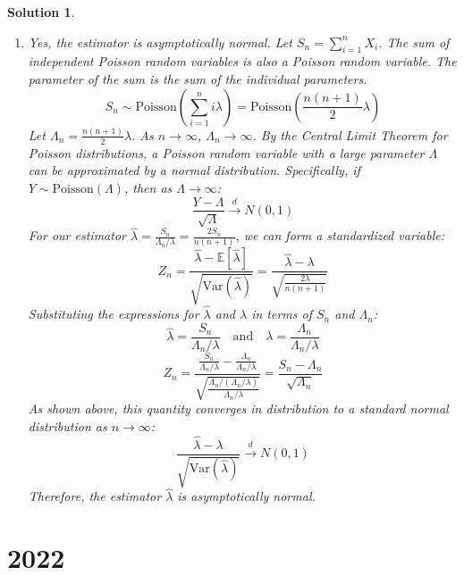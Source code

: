 \documentclass[12pt]{amsart}
\newtheorem*{solution}{Solution}
\begin{document}
\begin{solution}
\begin{enumerate}[label=(\alph*)]
Now, we compute the variance of our estimator $\hat{\lambda}$. Since the $X_i$ are independent and $\text{Var}(X_i) = i\lambda$ for a Poisson distribution:
$$ \text{Var}(\hat{\lambda}) = \text{Var}\left(\frac{2 \sum X_i}{n(n+1)}\right) = \left(\frac{2}{n(n+1)}\right)^2 \text{Var}\left(\sum X_i\right) = \frac{4}{[n(n+1)]^2} \sum_{i=1}^n \text{Var}(X_i) $$
$$ \text{Var}(\hat{\lambda}) = \frac{4}{[n(n+1)]^2} \sum_{i=1}^n i\lambda = \frac{4\lambda}{[n(n+1)]^2} \frac{n(n+1)}{2} = \frac{2\lambda}{n(n+1)} $$
Since $\text{Var}(\hat{\lambda})$ is equal to the CRLB, our estimator $\hat{\lambda}$ is the UMVUE, which is the best unbiased estimator.

\item
Yes, the estimator is asymptotically normal.
Let $S_n = \sum_{i=1}^n X_i$. The sum of independent Poisson random variables is also a Poisson random variable. The parameter of the sum is the sum of the individual parameters.
$$ S_n \sim \text{Poisson}\left(\sum_{i=1}^n i\lambda\right) = \text{Poisson}\left(\frac{n(n+1)}{2}\lambda\right) $$
Let $\Lambda_n = \frac{n(n+1)}{2}\lambda$. As $n \to \infty$, $\Lambda_n \to \infty$.
By the Central Limit Theorem for Poisson distributions, a Poisson random variable with a large parameter $\Lambda$ can be approximated by a normal distribution. Specifically, if $Y \sim \text{Poisson}(\Lambda)$, then as $\Lambda \to \infty$:
$$ \frac{Y - \Lambda}{\sqrt{\Lambda}} \xrightarrow{d} N(0,1) $$
For our estimator $\hat{\lambda} = \frac{S_n}{\Lambda_n/\lambda} = \frac{2S_n}{n(n+1)}$, we can form a standardized variable:
$$ Z_n = \frac{\hat{\lambda} - \mathbb{E}[\hat{\lambda}]}{\sqrt{\text{Var}(\hat{\lambda})}} = \frac{\hat{\lambda} - \lambda}{\sqrt{\frac{2\lambda}{n(n+1)}}} $$
Substituting the expressions for $\hat{\lambda}$ and $\lambda$ in terms of $S_n$ and $\Lambda_n$:
$$ \hat{\lambda} = \frac{S_n}{\Lambda_n/\lambda} \quad \text{and} \quad \lambda = \frac{\Lambda_n}{\Lambda_n/\lambda} $$
$$ Z_n = \frac{\frac{S_n}{\Lambda_n/\lambda} - \frac{\Lambda_n}{\Lambda_n/\lambda}}{\sqrt{\frac{\Lambda_n / (\Lambda_n/\lambda)}{\Lambda_n/\lambda}}} = \frac{S_n - \Lambda_n}{\sqrt{\Lambda_n}} $$
As shown above, this quantity converges in distribution to a standard normal distribution as $n \to \infty$:
$$ \frac{\hat{\lambda} - \lambda}{\sqrt{\text{Var}(\hat{\lambda})}} \xrightarrow{d} N(0,1) $$
Therefore, the estimator $\hat{\lambda}$ is asymptotically normal.
\end{enumerate}
\end{solution}

\section*{2022}
\end{document}
